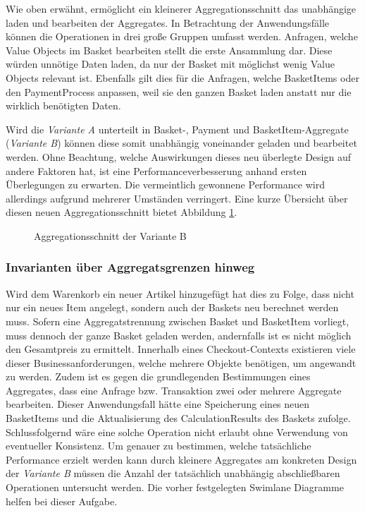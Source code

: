 Wie oben erwähnt, ermöglicht ein kleinerer Aggregationsschnitt das unabhängige laden und bearbeiten der Aggregates. In Betrachtung der Anwendungsfälle können die Operationen in drei große Gruppen umfasst werden. Anfragen, welche Value Objects im Basket bearbeiten stellt die erste Ansammlung dar. Diese würden unnötige Daten laden, da nur der Basket mit möglichst wenig Value Objects relevant ist. Ebenfalls gilt dies für die Anfragen, welche BasketItems oder den PaymentProcess anpassen, weil sie den ganzen Basket laden anstatt nur die wirklich benötigten Daten.

Wird die \emph{Variante A} unterteilt in Basket-, Payment und BasketItem-Aggregate (\emph{Variante B}) können diese somit unabhängig voneinander geladen und bearbeitet werden. Ohne Beachtung, welche Auswirkungen dieses neu überlegte Design auf andere Faktoren hat, ist eine Performanceverbesserung anhand ersten Überlegungen zu erwarten. Die vermeintlich gewonnene Performance wird allerdings aufgrund mehrerer Umständen verringert. Eine kurze Übersicht über diesen neuen Aggregationsschnitt bietet Abbildung \ref{fig:VarB}.

\begin{figure}[htbp]
	\centering
	
	\caption{Aggregationsschnitt der Variante B}
	\label{fig:VarB}
\end{figure}

\subsubsection{Invarianten über Aggregatsgrenzen hinweg}

Wird dem Warenkorb ein neuer Artikel hinzugefügt hat dies zu Folge, dass nicht nur ein neues Item angelegt, sondern auch der Baskets neu berechnet werden muss. Sofern eine Aggregatstrennung zwischen Basket und BasketItem vorliegt, muss dennoch der ganze Basket geladen werden, andernfalls ist es nicht möglich den Gesamtpreis zu ermittelt. Innerhalb eines Checkout-Contexts existieren viele dieser Businessanforderungen, welche mehrere Objekte benötigen, um angewandt zu werden. Zudem ist es gegen die grundlegenden Bestimmungen eines Aggregates, dass eine Anfrage bzw. Transaktion zwei oder mehrere Aggregate bearbeiten. Dieser Anwendungsfall hätte eine Speicherung eines neuen BasketItems und die Aktualisierung des CalculationResults des Baskets zufolge. Schlussfolgernd wäre eine solche Operation nicht erlaubt ohne Verwendung von eventueller Konsistenz. Um genauer zu bestimmen, welche tatsächliche Performance erzielt werden kann durch kleinere Aggregates am konkreten Design der \emph{Variante B} müssen die Anzahl der tatsächlich unabhängig abschließbaren Operationen untersucht werden. Die vorher festgelegten Swimlane Diagramme helfen bei dieser Aufgabe.

